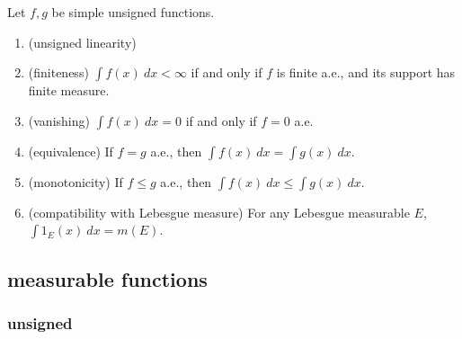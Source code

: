 \documentclass[12pt]{article}
\begin{document}
\begin{proposition}
	Let $f,g$ be simple unsigned functions. \hfill
	\begin{enumerate}
		\item (unsigned linearity)
		\item (finiteness) $\int f(x)\ dx<\infty$ if and only if $f$ is finite a.e., and its support has finite measure.
		\item (vanishing) $\int f(x)\ dx=0$ if and only if $f=0$ a.e.
		\item (equivalence) If $f=g$ a.e., then $\int f(x)\ dx=\int g(x)\ dx$. 
		\item (monotonicity) If $f\leq g$ a.e., then $\int f(x)\ dx\leq \int g(x)\ dx$. 
		\item (compatibility with Lebesgue measure) For any Lebesgue measurable $E$, $\int 1_E(x)\ dx=m(E)$. 
	\end{enumerate}
\end{proposition}


\subsection{measurable functions} %

\subsubsection{unsigned} %
\end{document}
